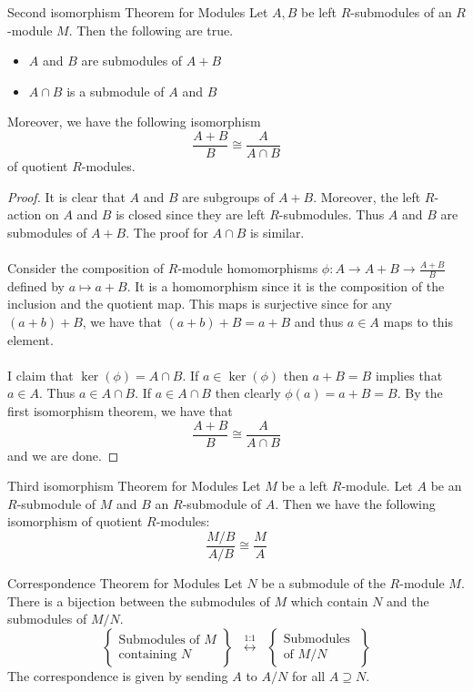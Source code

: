 \documentclass[a4paper]{article}
\begin{document}
\begin{thm}{Second isomorphism Theorem for Modules}{} Let $A,B$ be left $R$-submodules of an $R$-module $M$. Then the following are true. 
\begin{itemize}
\item $A$ and $B$ are submodules of $A+B$
\item $A\cap B$ is a submodule of $A$ and $B$
\end{itemize}
Moreover, we have the following isomorphism $$\frac{A+B}{B}\cong\frac{A}{A\cap B}$$ of quotient $R$-modules. 
\begin{proof}
It is clear that $A$ and $B$ are subgroups of $A+B$. Moreover, the left $R$-action on $A$ and $B$ is closed since they are left $R$-submodules. Thus $A$ and $B$ are submodules of $A+B$. The proof for $A\cap B$ is similar. \\~\\

Consider the composition of $R$-module homomorphisms $\phi:A\to A+B\to\frac{A+B}{B}$ defined by $a\mapsto a+B$. It is a homomorphism since it is the composition of the inclusion and the quotient map. This maps is surjective since for any $(a+b)+B$, we have that $(a+b)+B=a+B$ and thus $a\in A$ maps to this element. \\~\\
I claim that $\ker(\phi)=A\cap B$. If $a\in\ker(\phi)$ then $a+B=B$ implies that $a\in A$. Thus $a\in A\cap B$. If $a\in A\cap B$ then clearly $\phi(a)=a+B=B$. By the first isomorphism theorem, we have that $$\frac{A+B}{B}\cong\frac{A}{A\cap B}$$ and we are done. 
\end{proof}
\end{thm}

\begin{thm}{Third isomorphism Theorem for Modules}{} Let $M$ be a left $R$-module. Let $A$ be an $R$-submodule of $M$ and $B$ an $R$-submodule of $A$. Then we have the following isomorphism of quotient $R$-modules: $$\frac{M/B}{A/B}\cong\frac{M}{A}$$
\end{thm}

\begin{thm}{Correspondence Theorem for Modules}{} Let $N$ be a submodule of the $R$-module $M$. There is a bijection between the submodules of $M$ which contain $N$ and the submodules of $M/N$. $$\left\{\substack{\text{Submodules of }M\\\text{containing }N}\right\}\;\;\overset{\text{1:1}}{\longleftrightarrow}\;\;\left\{\substack{\text{Submodules }\\\text{of }M/N}\right\}$$ The correspondence is given by sending $A$ to $A/N$ for all $A\supseteq N$. 
\end{thm}
\end{document}
